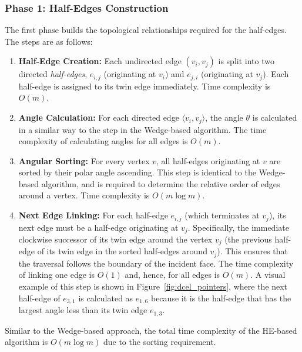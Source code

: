 \subsubsection{Phase 1: Half-Edges Construction}
The first phase builds the topological relationships required for the half-edges. The steps are as follows:

\begin{enumerate}
    \item \textbf{Half-Edge Creation:} Each undirected edge $(v_i, v_j)$ is split into two directed \textit{half-edges}, $e_{i,j}$ (originating at $v_i$) and $e_{j,i}$ (originating at $v_j$). Each half-edge is assigned to its twin edge immediately. Time complexity is $O(m)$.
    \item \textbf{Angle Calculation:} For each directed edge \( \langle v_i, v_j\rangle \), the angle \( \theta\) is calculated in a similar way to the step in the Wedge-based algorithm. The time complexity of calculating angles for all edges is \( O(m) \).
    \item \textbf{Angular Sorting:} For every vertex $v$, all half-edges originating at $v$ are sorted by their polar angle ascending. This step is identical to the Wedge-based algorithm, and is required to determine the relative order of edges around a vertex. Time complexity is $O(m \log m)$.
    \item \textbf{Next Edge Linking:} For each half-edge $e_{i,j}$ (which terminates at $v_j$), its next edge must be a half-edge originating at $v_j$. Specifically, the immediate clockwise successor of its twin edge around the vertex $v_j$ (the previous half-edge of its twin edge in the sorted half-edges around $v_j$). This ensures that the traversal follows the boundary of the incident face. The time complexity of linking one edge is $O(1)$ and, hence, for all edges is $O(m)$. A visual example of this step is shown in Figure~\ref{fig:dcel_pointers}, where the next half-edge of $e_{3,1}$ is calculated as $e_{1,6}$ because it is the half-edge that has the largest angle less than its twin edge $e_{1,3}$.
\end{enumerate}

Similar to the Wedge-based approach, the total time complexity of the HE-based algorithm is $O(m \log m)$ due to the sorting requirement.

